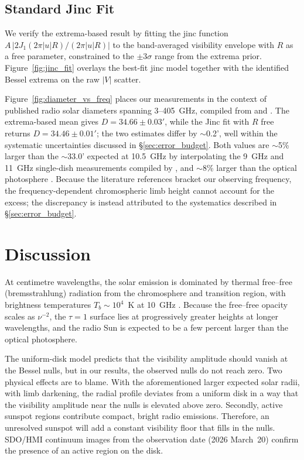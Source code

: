 \documentclass[10pt,preprint2]{aastex}
\begin{document}
\subsection{Standard Jinc Fit}
\label{sec:jinc_fit}

We verify the extrema-based result by fitting the jinc function $A\,|2J_1(2\pi|u|R)/(2\pi|u|R)|$ to the band-averaged visibility envelope with $R$ as a free parameter, constrained to the $\pm 3\sigma$ range from the extrema prior. Figure~\ref{fig:jinc_fit} overlays the best-fit jinc model together with the identified Bessel extrema on the raw $|V|$ scatter.

Figure~\ref{fig:diameter_vs_freq} places our measurements in the context of published radio solar diameters spanning 3--405~GHz, compiled from \citet{Menezes2021} and \citet{Marongiu2024}. The extrema-based mean gives $D = 34.66 \pm 0.03'$, while the Jinc fit with $R$ free returns $D = 34.46 \pm 0.01'$; the two estimates differ by $\sim$0.2', well within the systematic uncertainties discussed in \S\ref{sec:error_budget}. Both values are $\sim$5\% larger than the $\sim$33.0' expected at 10.5~GHz by interpolating the 9~GHz and 11~GHz single-dish measurements compiled by \citet{MenezesValio2017}, and $\sim$8\% larger than the optical photosphere \citep{BCD1998}. Because the literature references bracket our observing frequency, the frequency-dependent chromospheric limb height cannot account for the excess; the discrepancy is instead attributed to the systematics described in \S\ref{sec:error_budget}.


\section{Discussion}
\label{sec:discussion}

At centimetre wavelengths, the solar emission is dominated by thermal free--free (bremsstrahlung) radiation from the chromosphere and transition region, with brightness temperatures $T_b \sim 10^4$~K at 10~GHz \citep{Dulk1985}. Because the free--free opacity scales as $\nu^{-2}$, the $\tau = 1$ surface lies at progressively greater heights at longer wavelengths, and the radio Sun is expected to be a few percent larger than the optical photosphere. 

The uniform-disk model predicts that the visibility amplitude should vanish at the Bessel nulls, but in our results, the observed nulls do not reach zero. Two physical effects are to blame. With the aforementioned larger expected solar radii, with limb darkening, the radial profile deviates from a uniform disk in a way that the visibility amplitude near the nulls is elevated above zero. Secondly, active sunspot regions contribute compact, bright radio emissions. Therefore, an unresolved sunspot will add a constant visibility floor that fills in the nulls. SDO/HMI continuum images from the observation date (2026 March~20) confirm the presence of an active region on the disk. 
\end{document}
